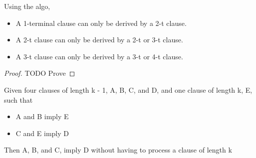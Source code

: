 \documentclass[manuscript]{acmart}
\begin{document}
    \begin{lemma}
        Using the algo, 
        \begin{itemize}
            \item A 1-terminal clause can only be derived by a 2-t clause.
            \item A 2-t clause can only be derived by a 2-t or 3-t clause.
            \item A 3-t clause can only be derived by a 3-t or 4-t clause.
        \end{itemize}
    \end{lemma}
    \begin{proof}
        TODO Prove
    \end{proof}

    \begin{lemma}
        Given four clauses of length k - 1, A, B, C, and D, and one clause of 
        length k, E, such that 
        \begin{itemize}
            \item A and B imply E
            \item C and E imply D
        \end{itemize}
        Then A, B, and C, imply D without having to process a clause of length k
    \end{lemma}
\end{document}
